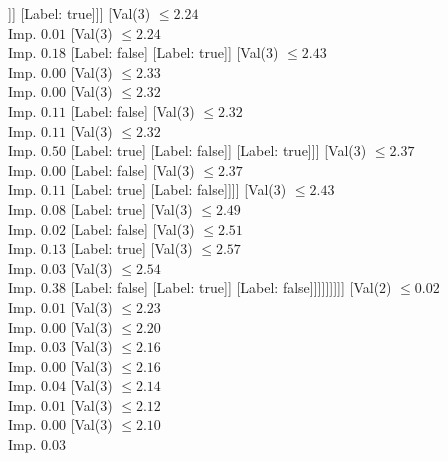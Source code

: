 \documentclass[margin=10pt]{standalone}
\begin{document}
\begin{forest}
												[Label: true]
												[Val($3$) $ \leq 2.11$ \\ Imp. $0.08$
													[Label: true]
													[Label: false]]]
											[Label: true]]]
									[Val($3$) $ \leq 2.24$ \\ Imp. $0.01$
										[Val($3$) $ \leq 2.24$ \\ Imp. $0.18$
											[Label: false]
											[Label: true]]
										[Val($3$) $ \leq 2.43$ \\ Imp. $0.00$
											[Val($3$) $ \leq 2.33$ \\ Imp. $0.00$
												[Val($3$) $ \leq 2.32$ \\ Imp. $0.11$
													[Label: false]
													[Val($3$) $ \leq 2.32$ \\ Imp. $0.11$
														[Val($3$) $ \leq 2.32$ \\ Imp. $0.50$
															[Label: true]
															[Label: false]]
														[Label: true]]]
												[Val($3$) $ \leq 2.37$ \\ Imp. $0.00$
													[Label: false]
													[Val($3$) $ \leq 2.37$ \\ Imp. $0.11$
														[Label: true]
														[Label: false]]]]
											[Val($3$) $ \leq 2.43$ \\ Imp. $0.08$
												[Label: true]
												[Val($3$) $ \leq 2.49$ \\ Imp. $0.02$
													[Label: false]
													[Val($3$) $ \leq 2.51$ \\ Imp. $0.13$
														[Label: true]
														[Val($3$) $ \leq 2.57$ \\ Imp. $0.03$
															[Val($3$) $ \leq 2.54$ \\ Imp. $0.38$
																[Label: false]
																[Label: true]]
															[Label: false]]]]]]]]]
							[Val($2$) $ \leq 0.02$ \\ Imp. $0.01$
								[Val($3$) $ \leq 2.23$ \\ Imp. $0.00$
									[Val($3$) $ \leq 2.20$ \\ Imp. $0.03$
										[Val($3$) $ \leq 2.16$ \\ Imp. $0.00$
											[Val($3$) $ \leq 2.16$ \\ Imp. $0.04$
												[Val($3$) $ \leq 2.14$ \\ Imp. $0.01$
													[Val($3$) $ \leq 2.12$ \\ Imp. $0.00$
														[Val($3$) $ \leq 2.10$ \\ Imp. $0.03$

\end{forest}
\end{document}
